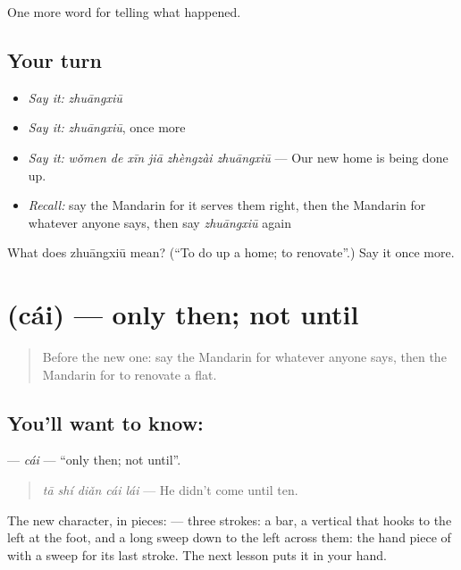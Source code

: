 \begin{grammarlens}[title={What you've built}]
One more word for telling what happened.
\end{grammarlens}

\subsection*{Your turn}
\begin{itemize}
\raggedright
  \item \emph{Say it:} \emph{zhuāngxiū}
  \item \emph{Say it:} \emph{zhuāngxiū}, once more
  \item \emph{Say it:} \emph{wǒmen de xīn jiā zhèngzài zhuāngxiū} — Our new home is being done up.
  \item \emph{Recall:} say the Mandarin for it serves them right, then the Mandarin for whatever anyone says, then say \emph{zhuāngxiū} again
\end{itemize}

\begin{tcolorbox}[breakable,colback=teal!4,colframe=teal!35!black,title={Before you move on}]
What does zhuāngxiū mean? (\textquotedblleft{}To do up a home; to renovate\textquotedblright{}.) Say it once more.
\end{tcolorbox}
\section[\texorpdfstring{\zh{才} (cái)}{才 (cái)}]{ (cái) — only then; not until}

\label{lesson:ZH-C313-cai}



\begin{quote}
Before the new one: say the Mandarin for whatever anyone says, then the Mandarin for to renovate a flat.
\end{quote}

\subsection*{You'll want to know: }
\textbf{} — \emph{cái} — \textquotedblleft{}only then; not until\textquotedblright{}.

\begin{quote}
\textbf{} \emph{tā shí diǎn cái lái} — He didn't come until ten.
\end{quote}

The new character, in pieces:  — three strokes: a bar, a vertical that hooks to the left at the foot, and a long sweep down to the left across them: the hand piece of  with a sweep for its last stroke. The next lesson puts it in your hand.

